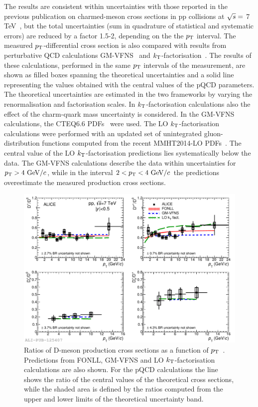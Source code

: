 The results are consistent within uncertainties with 
those reported in the previous publication on charmed-meson 
cross sections in pp collisions at $\sqrt{s}=$ 7 TeV~\cite{ALICE:2011aa,Abelev:2012tca},
but the total uncertainties (sum in quadrature of statistical and systematic
errors) are reduced by a factor 1.5-2, depending on the the $p_{\rm T}$ interval.
The measured $p_{\rm T}$-differential cross section is also compared with results from 
perturbative QCD calculations GM-VFNS~\cite{Kniehl:2004fy,Kniehl:2005mk,Kniehl:2012ti}
and $k_{\rm T}$-factorisation~\cite{Maciula:2013wg}.
The results of these calculations, performed in the same $p_{\rm T}$ intervals of the 
measurement, are shown as filled boxes spanning the theoretical uncertainties
and a solid line representing the values obtained with the central values of 
the pQCD parameters.
The theoretical uncertainties are estimated in the two frameworks
by varying the renormalisation and factorisation scales. 
In $k_{\rm T}$-factorisation calculations also the effect of the 
charm-quark mass uncertainty is considered.
In the GM-VFNS calculations, the CTEQ6.6 PDFs~\cite{Pumplin:2002vw}
were used. The LO $k_{\rm T}$-factorisation calculations were performed
with an updated set of unintegrated gluon-distribution functions computed 
from the recent MMHT2014-LO PDFs~\cite{Harland-Lang:2014zoa}.
The central value of the LO $k_{\rm T}$-factorisation predictions lies systematically 
below the data.
The GM-VFNS calculations describe the data within 
uncertainties for $p_{\rm T}>4~\mathrm{GeV}/c$, while in the interval
$2<p_{\rm T}<4~\mathrm{GeV}/c$ the predictions overestimate the measured production
cross sections.\\


\begin{figure}[!htb]
\begin{center}
\includegraphics[width=1\textwidth]{FigCap4/DmesonRatiosVsModels.pdf}
\caption{Ratios of D-meson production cross sections as a function of $p_{\rm T}$~\cite{Acharya:2017jgo}.
Predictions from FONLL, GM-VFNS and LO $k_{\rm T}$-factorisation calculations
are also shown. For the pQCD calculations the line shows the ratio of
the central values of the theoretical cross sections, while the shaded area is 
defined by the ratios computed from the upper and lower limits of the 
theoretical uncertainty band.}
\label{fig:DratiosVsPt}
\end{center}
\end{figure}



